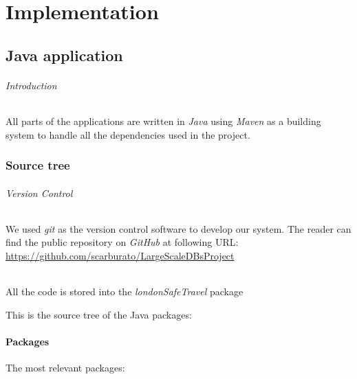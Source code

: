 \part{Implementation}

\chapter{Java application}

\paragraph{Introduction}
All parts of the applications are written in \textit{Java} using \textit{Maven} 
as a building system to handle all the dependencies used in the project.

\section{Source tree}

\paragraph{Version Control}
\label{banana}
We used \textit{git} as the version control software to develop our system. The 
reader can find the public repository on \textit{GitHub} at following URL: 
\url{https://github.com/scarburato/LargeScaleDBsProject}

\paragraph{}
All the code is stored into the \textit{londonSafeTravel} package

This is the source tree of the Java packages:



\subsection{Packages}
The most relevant packages:

